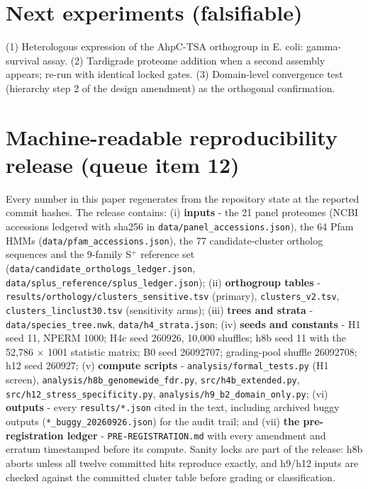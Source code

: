 \documentclass[12pt,a4paper]{article}
\begin{document}
\section{Next experiments (falsifiable)}
(1) Heterologous expression of the AhpC-TSA orthogroup in E. coli: gamma-survival assay. (2) Tardigrade proteome addition when a second assembly appears; re-run with identical locked gates. (3) Domain-level convergence test (hierarchy step 2 of the design amendment) as the orthogonal confirmation.

\appendix
\section{Machine-readable reproducibility release (queue item 12)}
Every number in this paper regenerates from the repository state at the reported commit hashes. The release contains: (i) \textbf{inputs} - the 21 panel proteomes (NCBI accessions ledgered with sha256 in \texttt{data/panel\_accessions.json}), the 64 Pfam HMMs (\texttt{data/pfam\_accessions.json}), the 77 candidate-cluster ortholog sequences and the 9-family S$^+$ reference set (\texttt{data/candidate\_orthologs\_ledger.json}, \texttt{data/splus\_reference/splus\_ledger.json}); (ii) \textbf{orthogroup tables} - \texttt{results/orthology/clusters\_sensitive.tsv} (primary), \texttt{clusters\_v2.tsv}, \texttt{clusters\_linclust30.tsv} (sensitivity arms); (iii) \textbf{trees and strata} - \texttt{data/species\_tree.nwk}, \texttt{data/h4\_strata.json}; (iv) \textbf{seeds and constants} - H1 seed 11, NPERM 1000; H4c seed 260926, 10{,}000 shuffles; h8b seed 11 with the 52{,}786 $\times$ 1001 statistic matrix; B0 seed 26092707; grading-pool shuffle 26092708; h12 seed 260927; (v) \textbf{compute scripts} - \texttt{analysis/formal\_tests.py} (H1 screen), \texttt{analysis/h8b\_genomewide\_fdr.py}, \texttt{src/h4b\_extended.py}, \texttt{src/h12\_stress\_specificity.py}, \texttt{analysis/h9\_b2\_domain\_only.py}; (vi) \textbf{outputs} - every \texttt{results/*.json} cited in the text, including archived buggy outputs (\texttt{*\_buggy\_20260926.json}) for the audit trail; and (vii) \textbf{the pre-registration ledger} - \texttt{PRE-REGISTRATION.md} with every amendment and erratum timestamped before its compute. Sanity locks are part of the release: h8b aborts unless all twelve committed hits reproduce exactly, and h9/h12 inputs are checked against the committed cluster table before grading or classification.
\end{document}
